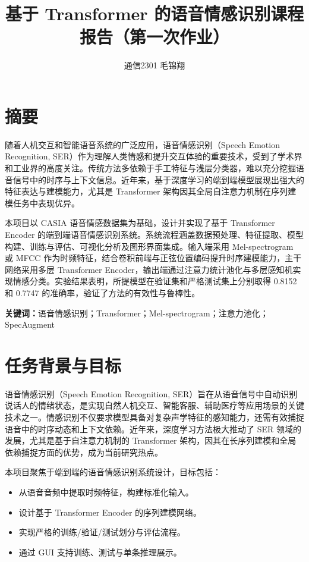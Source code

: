 \documentclass[UTF8, a4paper，12pt]{ctexart}
\title{基于 Transformer 的语音情感识别课程报告（第一次作业）}
\author{通信2301 毛锦翔}
\date{}
\begin{document}
\maketitle

\section*{摘要}

随着人机交互和智能语音系统的广泛应用，语音情感识别（Speech Emotion Recognition, SER）作为理解人类情感和提升交互体验的重要技术，受到了学术界和工业界的高度关注。传统方法多依赖于手工特征与浅层分类器，难以充分挖掘语音信号中的时序与上下文信息。近年来，基于深度学习的端到端模型展现出强大的特征表达与建模能力，尤其是 Transformer 架构因其全局自注意力机制在序列建模任务中表现优异。

本项目以 CASIA 语音情感数据集为基础，设计并实现了基于 Transformer Encoder 的端到端语音情感识别系统。系统流程涵盖数据预处理、特征提取、模型构建、训练与评估、可视化分析及图形界面集成。输入端采用 Mel-spectrogram 或 MFCC 作为时频特征，结合卷积前端与正弦位置编码提升时序建模能力，主干网络采用多层 Transformer Encoder，输出端通过注意力统计池化与多层感知机实现情感分类。实验结果表明，所提模型在验证集和严格测试集上分别取得 0.8152 和 0.7747 的准确率，验证了方法的有效性与鲁棒性。

\textbf{关键词：}语音情感识别；Transformer；Mel-spectrogram；注意力池化；SpecAugment

\section{任务背景与目标}

语音情感识别（Speech Emotion Recognition, SER）旨在从语音信号中自动识别说话人的情绪状态，是实现自然人机交互、智能客服、辅助医疗等应用场景的关键技术之一。情感识别不仅要求模型具备对复杂声学特征的感知能力，还需有效捕捉语音中的时序动态和上下文依赖。近年来，深度学习方法极大推动了 SER 领域的发展，尤其是基于自注意力机制的 Transformer 架构，因其在长序列建模和全局依赖捕捉方面的优势，成为当前研究热点。

本项目聚焦于端到端的语音情感识别系统设计，目标包括：

\begin{itemize}
  \item 从语音音频中提取时频特征，构建标准化输入。
  \item 设计基于 Transformer Encoder 的序列建模网络。
  \item 实现严格的训练/验证/测试划分与评估流程。
  \item 通过 GUI 支持训练、测试与单条推理展示。
\end{itemize}
\end{document}
